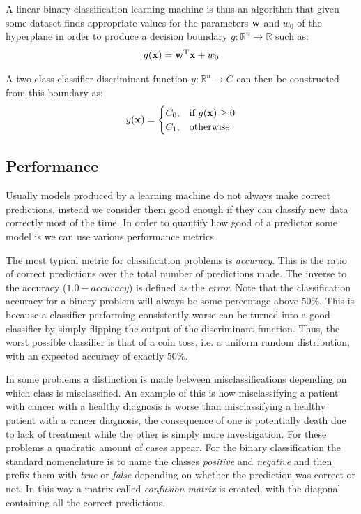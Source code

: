 A linear binary classification learning machine is thus an algorithm that given some dataset finds appropriate values for the parameters $\mathbf{w}$ and $w_0$ of the hyper\-plane in order to produce a decision boundary $g : \mathbb{R}^n \rightarrow \mathbb{R}$ such as:
\begin{align}
    g(\mathbf{x}) = \mathbf{w}^{\text{T}}\mathbf{x} + w_0
\end{align}

A two-class classifier discriminant function $y : \mathbb{R}^n \rightarrow C$ can then be constructed from this boundary as:
\begin{align}
    y(\mathbf{x}) = 
    \begin{cases}
        C_0,  & \text{if } g(\mathbf{x})\geq 0\\
        C_1,  & \text{otherwise}
    \end{cases}
    \label{eq:ch4.drule}
\end{align}

\subsection{Performance}
\label{sec:ch4.performance}

Usually models produced by a learning machine do not always make correct pre\-dict\-ions, instead we consider them good enough if they can classify new data correctly most of the time. In order to quantify how good of a predictor some model is we can use various performance metrics.

The most typical metric for classification problems is \emph{accuracy}. This is the ratio of correct predictions over the total number of predictions made. The inverse to the accuracy ($1.0 - accuracy$) is defined as the \emph{error}. Note that the classification accuracy for a binary problem will always be some percentage above 50\%. This is because a classifier performing consistently worse can be turned into a good classifier by simply flipping the output of the discriminant function. Thus, the worst possible classifier is that of a coin toss, i.e. a uniform random distribution, with an expected accuracy of exactly 50\%.

In some problems a distinction is made between misclassifications depending on which class is misclassified. An example of this is how misclassifying a patient with cancer with a healthy diagnosis is worse than misclassifying a healthy patient with a cancer diagnosis, the consequence of one is potentially death due to lack of treatment while the other is simply more investigation. For these problems a quadratic amount of cases appear. For the binary classification the standard nomenclature is to name the classes \emph{positive} and \emph{negative} and then prefix them with \emph{true} or \emph{false} depending on whether the prediction was correct or not. In this way a matrix called \emph{confusion matrix} is created, with the diagonal containing all the correct predictions.

